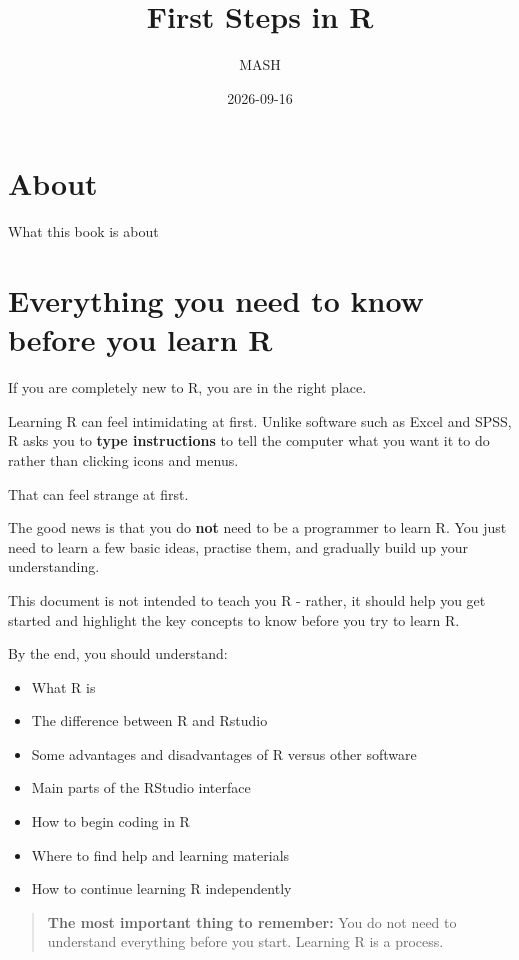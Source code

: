 \documentclass[
]{book}
\title{First Steps in R}
\author{MASH}
\date{2026-09-16}
\providecommand{\tightlist}{%
  \setlength{\itemsep}{0pt}\setlength{\parskip}{0pt}}
\begin{document}
\maketitle

{
\setcounter{tocdepth}{1}
\tableofcontents
}
\chapter{About}\label{about}

What this book is about

\chapter{Everything you need to know before you learn R}\label{everything-you-need-to-know-before-you-learn-r}

If you are completely new to R, you are in the right place.

Learning R can feel intimidating at first. Unlike software such as Excel and SPSS, R asks you to \textbf{type instructions} to tell the computer what you want it to do rather than clicking icons and menus.

That can feel strange at first.

The good news is that you do \textbf{not} need to be a programmer to learn R. You just need to learn a few basic ideas, practise them, and gradually build up your understanding.

This document is not intended to teach you R - rather, it should help you get started and highlight the key concepts to know before you try to learn R.

By the end, you should understand:

\begin{itemize}
\tightlist
\item
  What R is
\item
  The difference between R and Rstudio
\item
  Some advantages and disadvantages of R versus other software
\item
  Main parts of the RStudio interface
\item
  How to begin coding in R
\item
  Where to find help and learning materials
\item
  How to continue learning R independently
\end{itemize}

\begin{quote}
\textbf{The most important thing to remember:} You do not need to understand everything before you start. Learning R is a process.
\end{quote}
\end{document}
